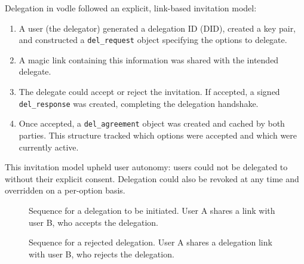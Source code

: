 Delegation in vodle followed an explicit, link-based invitation model:

\begin{enumerate}
    \item A user (the delegator) generated a delegation ID (DID), created a key pair, and constructed a \texttt{del\_request} object specifying the options to delegate.
    \item A magic link containing this information was shared with the intended delegate.
    \item The delegate could accept or reject the invitation. If accepted, a signed \texttt{del\_response} was created, completing the delegation handshake.
    \item Once accepted, a \texttt{del\_agreement} object was created and cached by both parties. This structure tracked which options were accepted and which were currently active.
\end{enumerate}

This invitation model upheld user autonomy: users could not be delegated to without their explicit consent. Delegation could also be revoked at any time and overridden on a per-option basis.

\begin{figure}[H]
  \centering
  \caption{Sequence for a delegation to be initiated. User A shares a link with user B, who accepts the delegation.}
  \label{fig:delegation-flow-accept}
\end{figure}

\begin{figure}[H]
  \centering
  \caption{Sequence for a rejected delegation. User A shares a delegation link with user B, who rejects the delegation.}
  \label{fig:delegation-flow-reject}
\end{figure}


